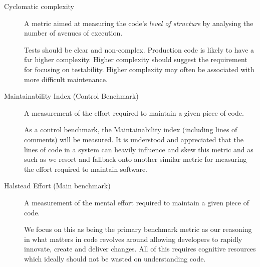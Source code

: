 \begin{description}
	\item [Cyclomatic complexity] A metric aimed at measuring the code's \textit{level of structure} by analysing the number of avenues of execution. 
	
	Tests should be clear and non-complex. Production code is likely to have a far higher complexity. Higher complexity should suggest the requirement for focusing on testability. Higher complexity may often be associated with more difficult maintenance.
	
	\item [Maintainability Index (Control Benchmark)] A measurement of the effort required to maintain a given piece of code. 
	
	As a control benchmark, the Maintainability index (including lines of comments) will be measured. It is understood and appreciated that the lines of code in a system can heavily influence and skew this metric and as such as we resort and fallback onto another similar metric for measuring the effort required to maintain software.
	
	\item[Halstead Effort (Main benchmark)] A measurement of the mental effort required to maintain a given piece of code.
	
	We focus on this as being the primary benchmark metric as our reasoning in what matters in code revolves around allowing developers to rapidly innovate, create and deliver changes. All of this requires cognitive resources which ideally should not be wasted on understanding code.
\end{description}